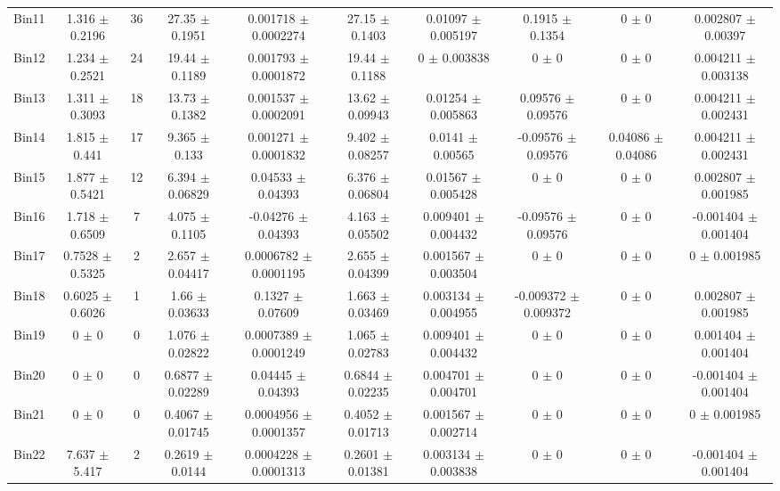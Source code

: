 \begin{tabular}{@{\extracolsep{4pt}}lccccccccc@{}}
     Bin11 & 1.316 $\pm$ 0.2196 & 36 & 27.35 $\pm$ 0.1951 & 0.001718 $\pm$ 0.0002274 & 27.15 $\pm$ 0.1403 & 0.01097 $\pm$ 0.005197 & 0.1915 $\pm$ 0.1354 & 0 $\pm$ 0 & 0.002807 $\pm$ 0.00397 \\ 
     Bin12 & 1.234 $\pm$ 0.2521 & 24 & 19.44 $\pm$ 0.1189 & 0.001793 $\pm$ 0.0001872 & 19.44 $\pm$ 0.1188 & 0 $\pm$ 0.003838 & 0 $\pm$ 0 & 0 $\pm$ 0 & 0.004211 $\pm$ 0.003138 \\ 
     Bin13 & 1.311 $\pm$ 0.3093 & 18 & 13.73 $\pm$ 0.1382 & 0.001537 $\pm$ 0.0002091 & 13.62 $\pm$ 0.09943 & 0.01254 $\pm$ 0.005863 & 0.09576 $\pm$ 0.09576 & 0 $\pm$ 0 & 0.004211 $\pm$ 0.002431 \\ 
     Bin14 & 1.815 $\pm$ 0.441 & 17 & 9.365 $\pm$ 0.133 & 0.001271 $\pm$ 0.0001832 & 9.402 $\pm$ 0.08257 & 0.0141 $\pm$ 0.00565 & -0.09576 $\pm$ 0.09576 & 0.04086 $\pm$ 0.04086 & 0.004211 $\pm$ 0.002431 \\ 
     Bin15 & 1.877 $\pm$ 0.5421 & 12 & 6.394 $\pm$ 0.06829 & 0.04533 $\pm$ 0.04393 & 6.376 $\pm$ 0.06804 & 0.01567 $\pm$ 0.005428 & 0 $\pm$ 0 & 0 $\pm$ 0 & 0.002807 $\pm$ 0.001985 \\ 
     Bin16 & 1.718 $\pm$ 0.6509 & 7 & 4.075 $\pm$ 0.1105 & -0.04276 $\pm$ 0.04393 & 4.163 $\pm$ 0.05502 & 0.009401 $\pm$ 0.004432 & -0.09576 $\pm$ 0.09576 & 0 $\pm$ 0 & -0.001404 $\pm$ 0.001404 \\ 
     Bin17 & 0.7528 $\pm$ 0.5325 & 2 & 2.657 $\pm$ 0.04417 & 0.0006782 $\pm$ 0.0001195 & 2.655 $\pm$ 0.04399 & 0.001567 $\pm$ 0.003504 & 0 $\pm$ 0 & 0 $\pm$ 0 & 0 $\pm$ 0.001985 \\ 
     Bin18 & 0.6025 $\pm$ 0.6026 & 1 & 1.66 $\pm$ 0.03633 & 0.1327 $\pm$ 0.07609 & 1.663 $\pm$ 0.03469 & 0.003134 $\pm$ 0.004955 & -0.009372 $\pm$ 0.009372 & 0 $\pm$ 0 & 0.002807 $\pm$ 0.001985 \\ 
     Bin19 & 0 $\pm$ 0 & 0 & 1.076 $\pm$ 0.02822 & 0.0007389 $\pm$ 0.0001249 & 1.065 $\pm$ 0.02783 & 0.009401 $\pm$ 0.004432 & 0 $\pm$ 0 & 0 $\pm$ 0 & 0.001404 $\pm$ 0.001404 \\ 
     Bin20 & 0 $\pm$ 0 & 0 & 0.6877 $\pm$ 0.02289 & 0.04445 $\pm$ 0.04393 & 0.6844 $\pm$ 0.02235 & 0.004701 $\pm$ 0.004701 & 0 $\pm$ 0 & 0 $\pm$ 0 & -0.001404 $\pm$ 0.001404 \\ 
     Bin21 & 0 $\pm$ 0 & 0 & 0.4067 $\pm$ 0.01745 & 0.0004956 $\pm$ 0.0001357 & 0.4052 $\pm$ 0.01713 & 0.001567 $\pm$ 0.002714 & 0 $\pm$ 0 & 0 $\pm$ 0 & 0 $\pm$ 0.001985 \\ 
     Bin22 & 7.637 $\pm$ 5.417 & 2 & 0.2619 $\pm$ 0.0144 & 0.0004228 $\pm$ 0.0001313 & 0.2601 $\pm$ 0.01381 & 0.003134 $\pm$ 0.003838 & 0 $\pm$ 0 & 0 $\pm$ 0 & -0.001404 $\pm$ 0.001404 \\ 

\end{tabular}

